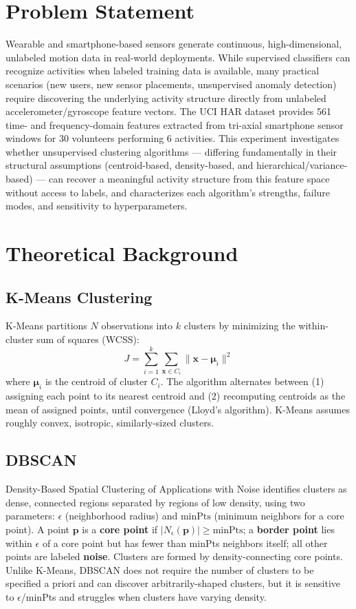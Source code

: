 \documentclass[12pt,a4paper]{article}
\begin{document}
\section{Problem Statement}
Wearable and smartphone-based sensors generate continuous, high-dimensional, unlabeled motion data in real-world deployments. While supervised classifiers can recognize activities when labeled training data is available, many practical scenarios (new users, new sensor placements, unsupervised anomaly detection) require discovering the underlying activity structure directly from unlabeled accelerometer/gyroscope feature vectors. The UCI HAR dataset provides 561 time- and frequency-domain features extracted from tri-axial smartphone sensor windows for 30 volunteers performing 6 activities. This experiment investigates whether unsupervised clustering algorithms — differing fundamentally in their structural assumptions (centroid-based, density-based, and hierarchical/variance-based) — can recover a meaningful activity structure from this feature space without access to labels, and characterizes each algorithm's strengths, failure modes, and sensitivity to hyperparameters.

\section{Theoretical Background}

\subsection{K-Means Clustering}
K-Means partitions $N$ observations into $k$ clusters by minimizing the within-cluster sum of squares (WCSS):
\begin{equation}
J = \sum_{i=1}^{k} \sum_{\mathbf{x} \in C_i} \lVert \mathbf{x} - \boldsymbol{\mu}_i \rVert^2
\end{equation}
where $\boldsymbol{\mu}_i$ is the centroid of cluster $C_i$. The algorithm alternates between (1) assigning each point to its nearest centroid and (2) recomputing centroids as the mean of assigned points, until convergence (Lloyd's algorithm). K-Means assumes roughly convex, isotropic, similarly-sized clusters.

\subsection{DBSCAN}
Density-Based Spatial Clustering of Applications with Noise identifies clusters as dense, connected regions separated by regions of low density, using two parameters: $\epsilon$ (neighborhood radius) and $\text{minPts}$ (minimum neighbors for a core point). A point $\mathbf{p}$ is a \textbf{core point} if $|N_\epsilon(\mathbf{p})| \ge \text{minPts}$; a \textbf{border point} lies within $\epsilon$ of a core point but has fewer than minPts neighbors itself; all other points are labeled \textbf{noise}. Clusters are formed by density-connecting core points. Unlike K-Means, DBSCAN does not require the number of clusters to be specified a priori and can discover arbitrarily-shaped clusters, but it is sensitive to $\epsilon$/minPts and struggles when clusters have varying density.
\end{document}
